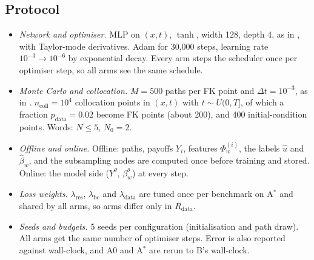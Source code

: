 \documentclass[english]{article}
\newcommand{\tbc}[1]{\textcolor{red}{#1}}
\begin{document}

\subsection{Protocol}\label{sec:protocol}
\begin{itemize}[leftmargin=*]
  \item \emph{Network and optimiser.} MLP on $(x,t)$, $\tanh$, width 128, depth 4, as in \cite[App.~E.2.1]{tepakbong2026taming}, with Taylor-mode derivatives. Adam for 30{,}000 steps, learning rate $10^{-3}\to10^{-6}$ by exponential decay. Every arm steps the scheduler once per optimiser step, so all arms see the same schedule.
  \item \emph{Monte Carlo and collocation.} $M=500$ paths per FK point and $\Delta t = 10^{-3}$, as in \cite{tepakbong2026taming}. $n_\mathrm{coll}=10^4$ collocation points in $(x,t)$ with $t\sim U(0,T]$, of which a fraction $p_\mathrm{data} = 0.02$ become FK points (about 200), and 400 initial-condition points. Words: $N\le5$, $N_0 = 2$.
  \item \emph{Offline and online.} Offline: paths, payoffs $Y_i$, features $\Phi^{(i)}_w$, the labels $\hat u$ and $\hat\beta_w$, and the subsampling nodes are computed once before training and stored. Online: the model side ($Y^\theta$, $\beta^\theta_w$) at every step.
  \item \emph{Loss weights.} $\lambda_\mathrm{res}$, $\lambda_\mathrm{bc}$ and $\lambda_\mathrm{data}$ are tuned once per benchmark on A$^*$ and shared by all arms, so arms differ only in $R_\mathrm{data}$.
  \item \emph{Seeds and budgets.} 5 seeds per configuration (initialisation and path draw). All arms get the same number of optimiser steps. Error is also reported against wall-clock, and A0 and A$^*$ are rerun to B's wall-clock.
\end{itemize}
\newpage
\end{document}
